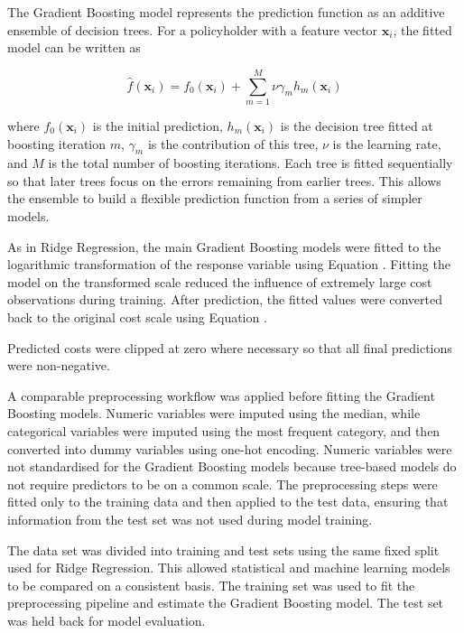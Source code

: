 	The Gradient Boosting model represents the prediction function as an additive ensemble of decision trees. For a policyholder with a feature vector \(\mathbf{x}_i\), the fitted model can be written as
	
	\begin{equation}
		\hat{f}(\mathbf{x}_i)
		=
		f_0(\mathbf{x}_i)
		+
		\sum_{m=1}^{M}
		\nu \gamma_m h_m(\mathbf{x}_i)
	\end{equation}
	
	where \(f_0(\mathbf{x}_i)\) is the initial prediction, \(h_m(\mathbf{x}_i)\) is the decision tree fitted at boosting iteration \(m\), \(\gamma_m\) is the contribution of this tree, \(\nu\) is the learning rate, and \(M\) is the total number of boosting iterations. Each tree is fitted sequentially so that later trees focus on the errors remaining from earlier trees. This allows the ensemble to build a flexible prediction function from a series of simpler models.
	
	As in Ridge Regression, the main Gradient Boosting models were fitted to the logarithmic transformation of the response variable using Equation . Fitting the model on the transformed scale reduced the influence of extremely large cost observations during training. After prediction, the fitted values were converted back to the original cost scale using Equation .
	
	Predicted costs were clipped at zero where necessary so that all final predictions were non-negative.
	
	A comparable preprocessing workflow was applied before fitting the Gradient Boosting models. Numeric variables were imputed using the median, while categorical variables were imputed using the most frequent category, and then converted into dummy variables using one-hot encoding. Numeric variables were not standardised for the Gradient Boosting models because tree-based models do not require predictors to be on a common scale. The preprocessing steps were fitted only to the training data and then applied to the test data, ensuring that information from the test set was not used during model training.
	
	The data set was divided into training and test sets using the same fixed split used for Ridge Regression. This allowed statistical and machine learning models to be compared on a consistent basis. The training set was used to fit the preprocessing pipeline and estimate the Gradient Boosting model. The test set was held back for model evaluation.
	
